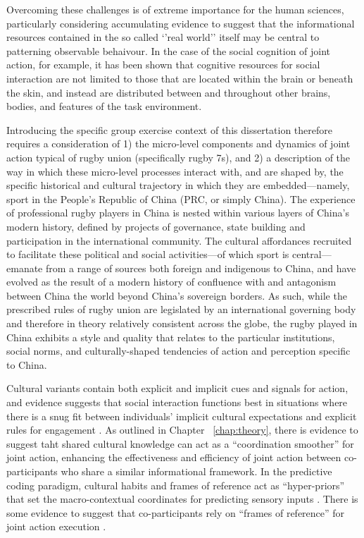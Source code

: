 \begin{CJK}{UTF8}{gbsn}
Overcoming these challenges is of extreme importance for the human sciences, particularly considering accumulating evidence to suggest that the informational resources contained in the so called ‘’real world’’ itself may be central to patterning observable behaivour.  In the case of the social cognition of joint action, for example, it has been shown that cognitive resources for social interaction are not limited to those that are located within the brain or beneath the skin, and instead are distributed between and throughout other brains, bodies, and features of the task environment.

Introducing the specific group exercise context of this dissertation therefore requires a consideration of 1) the micro-level components and dynamics of joint action typical of rugby union (specifically rugby 7s), and 2) a description of the way in which these micro-level processes interact with, and are shaped by, the specific historical and cultural trajectory in which they are embedded---namely, sport in the People's Republic of China (PRC, or simply China).   The experience of professional rugby players in China is nested within various layers of China's modern history, defined by projects of governance, state building and participation in the international community.  The cultural affordances recruited to facilitate these political and social activities---of which sport is central---emanate from a range of sources both foreign and indigenous to China, and have evolved as the result of a modern history of confluence with and antagonism between China the world beyond China's sovereign borders.  As such, while the prescribed rules of rugby union are legislated by an international governing body and therefore in theory relatively consistent across the globe, the rugby played in China exhibits a style and quality that relates to the particular institutions, social norms, and culturally-shaped tendencies of action and perception specific to China.

Cultural variants contain both explicit and implicit cues and signals for action, and evidence suggests that social interaction functions best in situations where there is a snug fit between individuals' implicit cultural expectations and explicit rules for engagement \citep{Vollan2017}.  As outlined in Chapter ~\ref{chap:theory}, there is evidence to suggest taht shared cultural knowledge can act as a ``coordination smoother'' \citep{Vesper2017} for joint action, enhancing the effectiveness and efficiency of joint action between co-participants who share a similar informational framework.  In the predictive coding paradigm, cultural habits and frames of reference act as ``hyper-priors'' that set the macro-contextual coordinates for predicting sensory inputs \citep{Clark2013}.   There is some evidence to suggest that co-participants rely on ``frames of reference'' for joint action execution \citep{Ray2018}.


\end{CJK}

